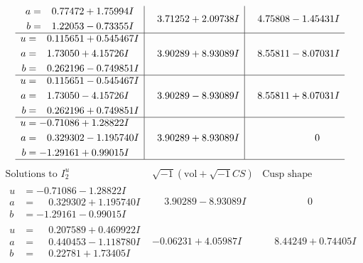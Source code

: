 \documentclass[1p]{elsarticle_modified}
\theoremstyle{definition}
\newcommand{\I}{\sqrt{-1}}
\begin{document}
$$\begin{array}{c|c|c}
\begin{aligned}
a &= \phantom{-}0.77472 + 1.75994 I \\
b &= \phantom{-}1.22053 - 0.73355 I\end{aligned}
 & \phantom{-}3.71252 + 2.09738 I & \phantom{-}4.75808 - 1.45431 I \\ \hline\begin{aligned}
u &= \phantom{-}0.115651 + 0.545467 I \\
a &= \phantom{-}1.73050 + 4.15726 I \\
b &= \phantom{-}0.262196 - 0.749851 I\end{aligned}
 & \phantom{-}3.90289 + 8.93089 I & \phantom{-}8.55811 - 8.07031 I \\ \hline\begin{aligned}
u &= \phantom{-}0.115651 - 0.545467 I \\
a &= \phantom{-}1.73050 - 4.15726 I \\
b &= \phantom{-}0.262196 + 0.749851 I\end{aligned}
 & \phantom{-}3.90289 - 8.93089 I & \phantom{-}8.55811 + 8.07031 I \\ \hline\begin{aligned}
u &= -0.71086 + 1.28822 I \\
a &= \phantom{-}0.329302 - 1.195740 I \\
b &= -1.29161 + 0.99015 I\end{aligned}
 & \phantom{-}3.90289 + 8.93089 I & \phantom{-0.000000 } 0\\
 \hline 
 \end{array}$$\newpage$$\begin{array}{c|c|c}  
\text{Solutions to }I^u_{2}& \I (\text{vol} + \sqrt{-1}CS) & \text{Cusp shape}\\
 \hline 
\begin{aligned}
u &= -0.71086 - 1.28822 I \\
a &= \phantom{-}0.329302 + 1.195740 I \\
b &= -1.29161 - 0.99015 I\end{aligned}
 & \phantom{-}3.90289 - 8.93089 I & \phantom{-0.000000 } 0 \\ \hline\begin{aligned}
u &= \phantom{-}0.207589 + 0.469922 I \\
a &= \phantom{-}0.440453 - 1.118780 I \\
b &= \phantom{-}0.22781 + 1.73405 I\end{aligned}
 & -0.06231 + 4.05987 I & \phantom{-}8.44249 + 0.74405 I \\ \hline\begin{aligned}

\end{aligned}
\end{array}$$
\end{document}
